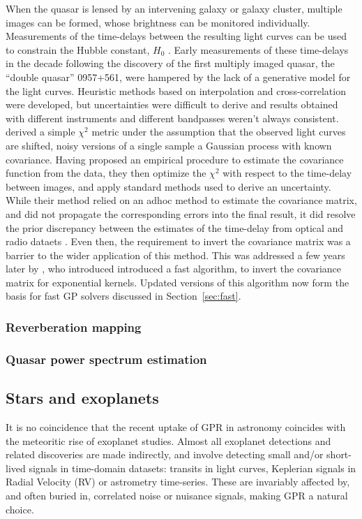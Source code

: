 \documentclass[letterpaper]{ar-1col}
\begin{document}
When the quasar is lensed by an intervening galaxy or galaxy cluster, multiple images can be formed, whose brightness can be monitored individually. Measurements of the time-delays between the resulting light curves can be used to constrain the Hubble constant, $H_0$ \citep{doi:10.1146/annurev.aa.30.090192.001523}. Early measurements of these time-delays in the decade following the discovery of the first multiply imaged quasar, the ``double quasar'' 0957$+$561, were hampered by the lack of a generative model for the light curves. Heuristic methods based on interpolation and cross-correlation were developed, but uncertainties were difficult to derive and results obtained with different instruments and different bandpasses weren't always consistent. \citet{prh92a} derived a simple $\chi^2$ metric under the assumption that the observed light curves are shifted, noisy versions of a single sample a Gaussian process with known covariance. Having proposed an empirical procedure to estimate the covariance function from the data, they then optimize the $\chi^2$ with respect to the time-delay between images, and apply standard methods used to derive an uncertainty. While their method relied on an adhoc method to estimate the covariance matrix, and did not propagate the corresponding errors into the final result, it did resolve the prior discrepancy between the estimates of the time-delay from optical and radio dataets \citet{prh92b}. Even then, the requirement to invert the covariance matrix was a barrier to the wider application of this method. This was addressed a few years later by \citet{pr95}, who introduced introduced a fast algorithm, to invert the covariance matrix for exponential kernels. Updated versions of this algorithm now form the basis for fast GP solvers discussed in Section~\ref{sec:fast}.

\subsubsection{Reverberation mapping}

\subsubsection{Quasar power spectrum estimation}

\subsection{Stars and exoplanets}

It is no coincidence that the recent uptake of GPR in astronomy coincides with the meteoritic rise of exoplanet studies. Almost all exoplanet detections and related discoveries are made indirectly, and involve detecting small and/or short-lived signals in time-domain datasets: transits in light curves, Keplerian signals in Radial Velocity (RV) or astrometry time-series. These are invariably affected by, and often buried in, correlated noise or nuisance signals, making GPR a natural choice. 
\end{document}
